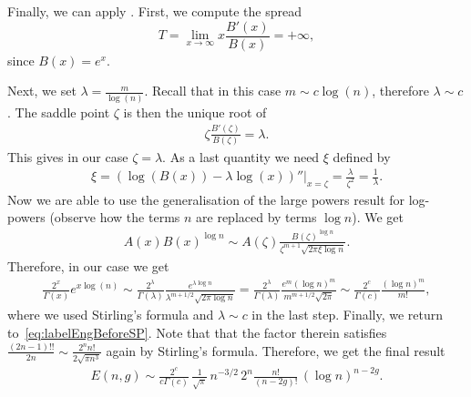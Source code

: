 \documentclass[a4paper,12pt]{article}
\theoremstyle{definition}
\begin{document}
Finally, we can apply \cite[Theorem~VIII.8]{flajolet}. First, we compute the spread 
\[
    T = \lim_{x \to \infty} x \frac{B'(x)}{B(x)} = + \infty,
\]
since $B(x)=e^x$.

Next, we set $\lambda = \frac{m}{\log(n)}$. 
Recall that in this case $m \sim c \log(n)$, therefore $\lambda \sim c$. 
The saddle point $\zeta$ is then the unique root of
\begin{align*}
    \zeta \frac{B'(\zeta)}{B(\zeta)} = \lambda.
\end{align*}
This gives in our case $\zeta=\lambda$.
As a last quantity we need $\xi$ defined by
\begin{align*}
    \xi = \left.\left( \log(B(x)) - \lambda \log(x)\right)''\right|_{x=\zeta}
        = \frac{\lambda}{\zeta^2} = \frac{1}{\lambda}.
\end{align*}
Now we are able to use the generalisation of the large powers result for log-powers (observe how the terms $n$ are replaced by terms $\log n$). We get 
\begin{align*}
    [x^m] A(x) B(x)^{\log n} 
        \sim A(\zeta) \frac{B(\zeta)^{\log n}}{\zeta^{m+1}\sqrt{2 \pi \xi \log n   }}.
\end{align*}
Therefore, in our case we get
\begin{align*}
    [x^m] \frac{2^x}{\Gamma(x)} e^{x \log(n)} 
        \sim \frac{2^\lambda}{\Gamma(\lambda)} \frac{e^{\lambda \log n}}{\lambda^{m+1/2} \sqrt{2 \pi \log n}} 
        = \frac{2^\lambda}{\Gamma(\lambda)} \frac{e^{m} (\log n)^{m}}{m^{m+1/2} \sqrt{2 \pi}}
        \sim  \frac{2^c}{\Gamma(c)} \frac{(\log n)^{m}}{m!},
\end{align*}
where we used Stirling's formula and $\lambda \sim c$ in the last step.
Finally, we return to~\eqref{eq:labelEngBeforeSP}. 
Note that that the factor therein satisfies $\frac{(2n-1)!!}{2n} \sim \frac{2^n n!}{2 \sqrt{\pi n^3}}$ again by Stirling's formula. 
Therefore, we get the final result
\begin{align*}
    E(n,g) 
        \sim \frac{2^{c}}{c\Gamma(c)} \, \frac{1}{\sqrt{\pi}} \, n^{-3/2} \, 2^n \frac{ n! }{(n-2g)!} \, (\log n)^{n-2g}.
\end{align*}
\end{document}
